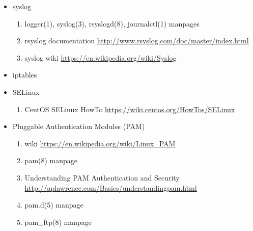 \documentclass{article}
\begin{document}
\begin{itemize}
\begin{enumerate}
        \end{enumerate}
    \item syslog
        \begin{enumerate}
            \item logger(1), syslog(3), rsyslogd(8), journalctl(1) manpages
            \item rsyslog documentation \url{http://www.rsyslog.com/doc/master/index.html}
            \item syslog wiki \url{https://en.wikipedia.org/wiki/Syslog}
        \end{enumerate}
    \item iptables
        \begin{enumerate}
        \end{enumerate}
    \item SELinux
        \begin{enumerate}
            \item CentOS SELinux HowTo \url{https://wiki.centos.org/HowTos/SELinux}
        \end{enumerate}
    \item Pluggable Authentication Modules (PAM)
        \begin{enumerate}
            \item wiki \url{https://en.wikipedia.org/wiki/Linux_PAM}
            \item pam(8) manpage
            \item Understanding PAM Authentication and Security \url{http://aplawrence.com/Basics/understandingpam.html}
            \item pam.d(5) manpage
            \item pam_ftp(8) manpage
        \end{enumerate}
\end{itemize}
\end{document}
